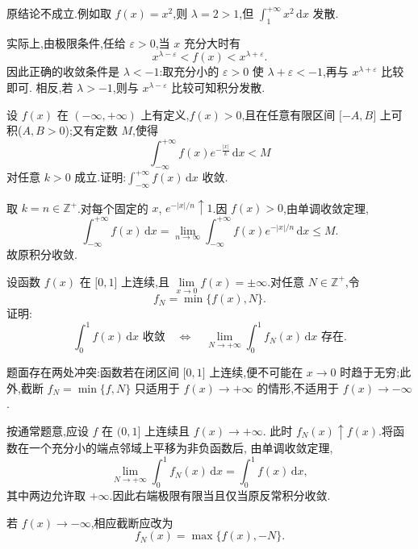 \begin{solution}
  原结论不成立.例如取 $f(x)=x^2$,则 $\lambda=2>1$,但
  $\displaystyle\int_1^{+\infty}x^2\,\mathrm{d}x$ 发散.

  实际上,由极限条件,任给 $\varepsilon>0$,当 $x$ 充分大时有
  \[
    x^{\lambda-\varepsilon}<f(x)<x^{\lambda+\varepsilon}.
  \]
  因此正确的收敛条件是 $\lambda<-1$:取充分小的 $\varepsilon>0$ 使
  $\lambda+\varepsilon<-1$,再与 $x^{\lambda+\varepsilon}$ 比较即可.
  相反,若 $\lambda>-1$,则与 $x^{\lambda-\varepsilon}$ 比较可知积分发散.
\end{solution}

\begin{example}
  设 $f(x)$ 在 $(-\infty,+\infty)$ 上有定义,$f(x)>0$,且在任意有限区间 $\lbrack -A,B\rbrack$ 上可积($A,B>0$);又有定数 $M$,使得
  \[
    \int_{-\infty}^{+\infty}f(x)e^{-\frac{|x|}{k}}\,\mathrm{d}x<M
  \]
  对任意 $k>0$ 成立.证明:$\displaystyle\int_{-\infty}^{+\infty}f(x)\,\mathrm{d}x$ 收敛.
\end{example}
\exampleblank

\begin{solution}
  取 $k=n\in\mathbb{Z}^+$.对每个固定的 $x$,
  $e^{-|x|/n}\uparrow1$.因 $f(x)>0$,由单调收敛定理,
  \[
    \int_{-\infty}^{+\infty}f(x)\,\mathrm{d}x
    =\lim\limits_{n\to\infty}\int_{-\infty}^{+\infty}
    f(x)e^{-|x|/n}\,\mathrm{d}x\leq M.
  \]
  故原积分收敛.
\end{solution}

\begin{example}
  设函数 $f(x)$ 在 $\lbrack 0,1\rbrack$ 上连续,且 $\displaystyle\lim\limits_{x\to0}f(x)=\pm\infty$.对任意 $N\in\mathbb{Z}^+$,令
  \[
    f_N=\min\{f(x),N\}.
  \]
  证明:
  \[
    \int_0^1f(x)\,\mathrm{d}x\text{ 收敛}
    \quad\Longleftrightarrow\quad
    \lim\limits_{N\to+\infty}\int_0^1f_N(x)\,\mathrm{d}x\text{ 存在}.
  \]
\end{example}
\exampleblank

\begin{solution}
  题面存在两处冲突:函数若在闭区间 $\lbrack0,1\rbrack$ 上连续,便不可能在
  $x\to0$ 时趋于无穷;此外,截断 $f_N=\min\{f,N\}$ 只适用于
  $f(x)\to+\infty$ 的情形,不适用于 $f(x)\to-\infty$.

  按通常题意,应设 $f$ 在 $(0,1\rbrack$ 上连续且 $f(x)\to+\infty$.
  此时 $f_N(x)\uparrow f(x)$.将函数在一个充分小的端点邻域上平移为非负函数后,
  由单调收敛定理,
  \[
    \lim\limits_{N\to+\infty}\int_0^1f_N(x)\,\mathrm{d}x
    =\int_0^1f(x)\,\mathrm{d}x,
  \]
  其中两边允许取 $+\infty$.因此右端极限有限当且仅当原反常积分收敛.

  若 $f(x)\to-\infty$,相应截断应改为
  \[
    f_N(x)=\max\{f(x),-N\}.
  \]
\end{solution}

